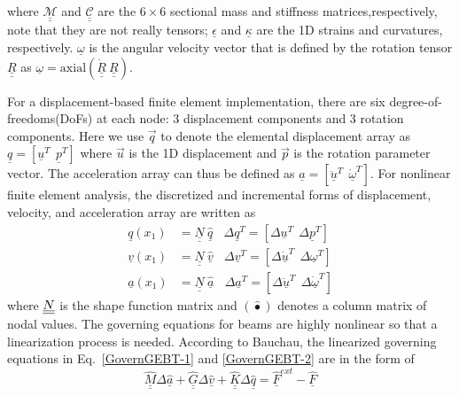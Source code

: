where $\underline{\underline{\mathcal{M}}}$ and
$\underline{\underline{\mathcal{C}}}$ are the $6 \times 6$ sectional mass
and stiffness matrices,respectively, note that they are not really tensors;
$\underline{\epsilon}$ and $\underline{\kappa}$ are the 1D strains and
curvatures, respectively. $\underline{\omega}$ is the angular velocity
vector that is defined by the rotation tensor $\underline{\underline{R}}$ as
$\underline{\omega} = \mathrm{axial}(\dot{\underline{\underline{R}}}~\underline{\underline{R}})$.

For a displacement-based finite element implementation, there are six
degree-of-freedoms(DoFs) at each node: 3 displacement components and 3
rotation components. Here we use $\vec{q}$ to denote the elemental
displacement array as $\underline{q}=\left[
\underline{u}^T~~\underline{p}^T\right]$ where $\vec{u}$ is the 1D
displacement and $\vec{p}$ is the rotation parameter vector. The
acceleration array can thus be defined as $\underline{a}=\left[
\ddot{\underline{u}}^T~~ \dot{\underline{\omega}}^T \right]$. For nonlinear
finite element analysis, the discretized and incremental forms of
displacement, velocity, and acceleration array are written as
\begin{align}
	\label{Discretized}
	\underline{q} (x_1) &= \underline{\underline{N}} ~\hat{\underline{q}}~~~~\Delta \underline{q}^T = \left[ \Delta \underline{u}^T~~\Delta \underline{p}^T \right] \\
	\underline{v}(x_1) &= \underline{\underline{N}}~\hat{\underline{v}}~~~~\Delta \underline{v}^T = \left[\Delta \underline{\dot{u}}^T~~\Delta \underline{\omega}^T \right] \\
	\underline{a}(x_1) &= \underline{\underline{N}}~ \hat{\underline{a}}~~~~\Delta \underline{a}^T = \left[ \Delta \ddot{\underline{u}}^T~~\Delta \dot{\underline{\omega}}^T \right]	
\end{align}
where $\underline{\underline{N}}$ is the shape function matrix and $(\hat{\bullet})$ denotes
a column matrix of nodal values.  The governing equations for beams are
highly nonlinear so that a linearization process is needed. According to
Bauchau\cite{Bauchau:2010}, the linearized governing equations in
Eq.~\eqref{GovernGEBT-1} and \eqref{GovernGEBT-2} are in the form of
\begin{equation}
	\label{LinearizedEqn}
	\hat{\underline{\underline{M}}} \Delta \hat{\underline{a}} +\hat{\underline{\underline{G}}} \Delta \hat{\underline{v}}+ \hat{\underline{\underline{K}}} \Delta \hat{\underline{q}} = \hat{\underline{F}}^{ext} - \hat{\underline{F}}
\end{equation} 
